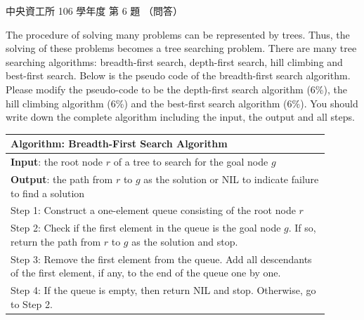 \begin{pastexam}[label={px:ncu-106-dsa-06}]{中央資工所 106 學年度 第 6 題}
（問答）

The procedure of solving many problems can be represented by trees. Thus, the solving of these
problems becomes a tree searching problem. There are many tree searching algorithms:
breadth-first search, depth-first search, hill climbing and best-first search. Below is the pseudo
code of the breadth-first search algorithm. Please modify the pseudo-code to be the depth-first
search algorithm (6\%), the hill climbing algorithm (6\%) and the best-first search algorithm
(6\%). You should write down the complete algorithm including the input, the output and all steps.

\begin{center}
\begin{tabular}{|p{0.9\linewidth}|}
\hline
\textbf{Algorithm:} Breadth-First Search Algorithm\\ \hline
\textbf{Input}: the root node $r$ of a tree to search for the goal node $g$\\
\textbf{Output}: the path from $r$ to $g$ as the solution or NIL to indicate failure to find a solution\\ \hline
Step 1: Construct a one-element queue consisting of the root node $r$\\
Step 2: Check if the first element in the queue is the goal node $g$. If so, return the path from $r$ to $g$ as the solution and stop.\\
Step 3: Remove the first element from the queue. Add all descendants of the first element, if any, to the end of the queue one by one.\\
Step 4: If the queue is empty, then return NIL and stop. Otherwise, go to Step 2.\\ \hline
\end{tabular}
\end{center}
\end{pastexam}

